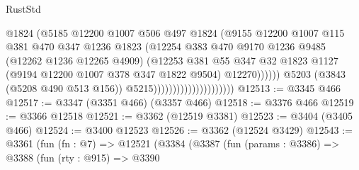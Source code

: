 \begin{lexlean}{RustStd}
\begin{coremodule}
                                                  @1824
                                                  (@5185
                                                    @12200
                                                    @1007
                                                    @506
                                                    @497
                                                    @1824
                                                    (@9155
                                                      @12200
                                                      @1007
                                                      @115
                                                      @381
                                                      @470
                                                      @347
                                                      @1236
                                                      @1823
                                                      (@12254
                                                        @383
                                                        @470
                                                        @9170
                                                        @1236
                                                        @9485
                                                        (@12262 @1236 @12265 @4909)
                                                        (@12253
                                                          @381
                                                          @55
                                                          @347
                                                          @32
                                                          @1823
                                                          @1127
                                                          (@9194 @12200 @1007 @378 @347 @1822 @9504)
                                                          @12270))))))
                                              @5203
                                              (@3843 (@5208 @490 @513 @156))
                                              @5215)))))))))))))))))))))
@12513 := @3345 @466
@12517 := @3347 (@3351 @466) (@3357 @466)
@12518 := @3376 @466
@12519 := @3366 @12518
@12521 := @3362 (@12519 @3381)
@12523 := @3404 (@3405 @466)
@12524 := @3400 @12523
@12526 := @3362 (@12524 @3429)
@12543 := @3361
    (fun (fn : @7) =>
    @12521
      (@3384
        (@3387
          (fun (params : @3386) =>
          @3388
            (fun (rty : @915) =>
            @3390

\end{coremodule}
\end{lexlean}
